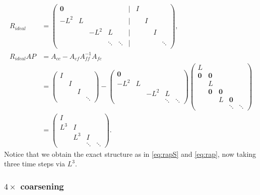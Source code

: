 \documentclass[a4paper,12pt]{article}
\begin{document}
\begin{align*}
R_{ideal} & = \begin{pmatrix} \mathbf{0} & & & & & \Big| & I \\ -L^2 & L & & & & \Big| & & I \\ & & -L^2 & L & & \Big| &&  & I \\ & & & \ddots & \ddots & \Big| && & & \ddots\end{pmatrix}, \\
R_{ideal}AP & = A_{cc} - A_{cf}A_{ff}^{-1}A_{fc} \\
& = \begin{pmatrix} I \\ & I \\ & & I \\ & & & \ddots\end{pmatrix} - \begin{pmatrix} \mathbf{0} \\ -L^2 & L \\ & & -L^2 & L \\ & & & \ddots & \ddots\end{pmatrix}
	 \begin{pmatrix} L \\ \mathbf{0} & \mathbf{0}  \\ & L \\ & \mathbf{0} & \mathbf{0} \\ & & L & \mathbf{0} \\ &&&\ddots&\ddots \end{pmatrix} \\
& = \begin{pmatrix} I \\ L^3 & I \\ & L^3 & I \\ && \ddots &\ddots\end{pmatrix}.
\end{align*}
%
Notice that we obtain the exact structure as in \eqref{eq:rapS} and \eqref{eq:rap}, now taking three time steps via $L^3$.

\subsubsection{$4\times$ coarsening}
\end{document}
